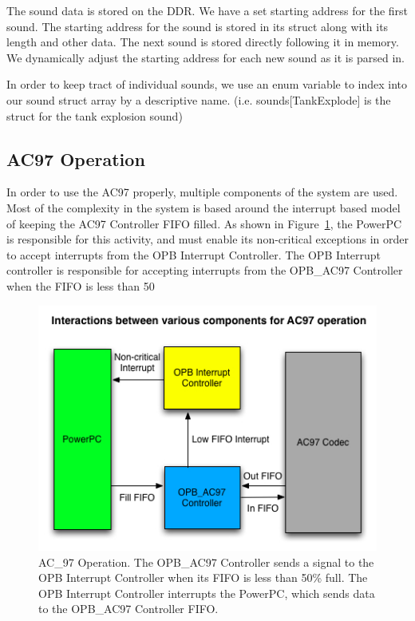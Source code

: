 \documentclass[11pt,letter,oneside]{report}
\begin{document}
The sound data is stored on the DDR.  We have a set starting address for the first sound.  The starting address for the sound is stored in its struct along with its length and other data.  The next sound is stored directly following it in memory.  We dynamically adjust the starting address for each new sound as it is parsed in.

In order to keep tract of individual sounds, we use an enum variable to index into our sound struct array by a descriptive name.  (i.e. sounds[TankExplode] is the struct for the tank explosion sound)

\subsection{AC97 Operation}

In order to use the AC97 properly, multiple components of the system are used.  Most of the complexity in the system is based around the interrupt based model of keeping the AC97 Controller FIFO filled. As shown in Figure~\ref{fig:AC97}, the PowerPC is responsible for this activity, and must enable its non-critical exceptions in order to accept interrupts from the OPB Interrupt Controller. The OPB Interrupt controller is responsible for accepting interrupts from the OPB\_AC97 Controller when the FIFO is less than 50%

\begin{figure}[H]
\centering
\includegraphics[scale=.7]{AC97_Operation.jpg}
\caption{AC\_97 Operation. The OPB\_AC97 Controller sends a signal to the OPB Interrupt Controller when its FIFO is less than 50\% full. The OPB Interrupt Controller interrupts the PowerPC, which sends data to the OPB\_AC97 Controller FIFO.}
\label{fig:AC97}
\end{figure}
\end{document}
